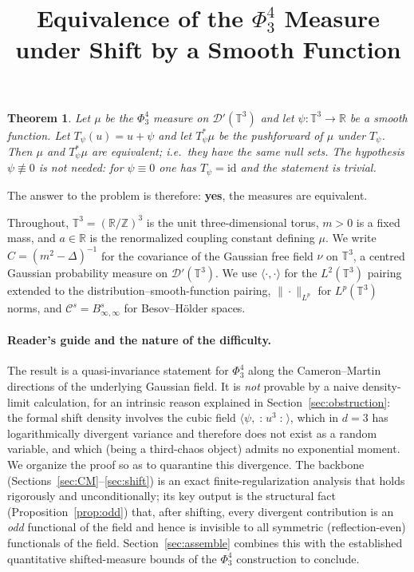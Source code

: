 \documentclass[12pt]{article}
\title{Equivalence of the $\Phi^4_3$ Measure under Shift by a Smooth Function}
\author{}
\date{}
\newcommand{\bR}{\mathbb{R}}
\newcommand{\bT}{\mathbb{T}}
\newcommand{\bZ}{\mathbb{Z}}
\newcommand{\cD}{\mathcal{D}}
\newcommand{\Wick}[1]{\mathopen{:}#1\mathclose{:}}
\theoremstyle{plain}
\newtheorem{theorem}{Theorem}
\theoremstyle{definition}
\begin{document}
\maketitle

\begin{theorem}\label{thm:main}
Let $\mu$ be the $\Phi^4_3$ measure on $\cD'(\bT^3)$ and let $\psi\colon\bT^3\to\bR$
be a smooth function. Let $T_\psi(u)=u+\psi$ and let $T_\psi^*\mu$ be the
pushforward of $\mu$ under $T_\psi$. Then $\mu$ and $T_\psi^*\mu$ are equivalent;
i.e.\ they have the same null sets. The hypothesis $\psi\not\equiv0$ is not needed:
for $\psi\equiv0$ one has $T_\psi=\mathrm{id}$ and the statement is trivial.
\end{theorem}

The answer to the problem is therefore: \textbf{yes}, the measures are equivalent.

\medskip

Throughout, $\bT^3=(\bR/\bZ)^3$ is the unit three-dimensional torus, $m>0$ is a
fixed mass, and $a\in\bR$ is the renormalized coupling constant defining $\mu$. We
write $C=(m^2-\Delta)^{-1}$ for the covariance of the Gaussian free field $\nu$ on
$\bT^3$, a centred Gaussian probability measure on $\cD'(\bT^3)$. We use
$\langle\cdot,\cdot\rangle$ for the $L^2(\bT^3)$ pairing extended to the
distribution--smooth-function pairing, $\|\cdot\|_{L^p}$ for $L^p(\bT^3)$ norms, and
$\mathcal C^s=B^s_{\infty,\infty}$ for Besov--H\"older spaces.

\paragraph{Reader's guide and the nature of the difficulty.}
The result is a quasi-invariance statement for $\Phi^4_3$ along the Cameron--Martin
directions of the underlying Gaussian field. It is \emph{not} provable by a naive
density-limit calculation, for an intrinsic reason explained in
Section~\ref{sec:obstruction}: the formal shift density involves the cubic field
$\langle\psi,\Wick{u^3}\rangle$, which in $d=3$ has logarithmically divergent
variance and therefore does not exist as a random variable, and which (being a
third-chaos object) admits no exponential moment. We organize the proof so as to
quarantine this divergence. The backbone (Sections~\ref{sec:CM}--\ref{sec:shift})
is an exact finite-regularization analysis that holds rigorously and unconditionally;
its key output is the structural fact (Proposition~\ref{prop:odd}) that, after
shifting, every divergent contribution is an \emph{odd} functional of the field and
hence is invisible to all symmetric (reflection-even) functionals of the field.
Section~\ref{sec:assemble} combines this with the established quantitative
shifted-measure bounds of the $\Phi^4_3$ construction to conclude.
\end{document}
